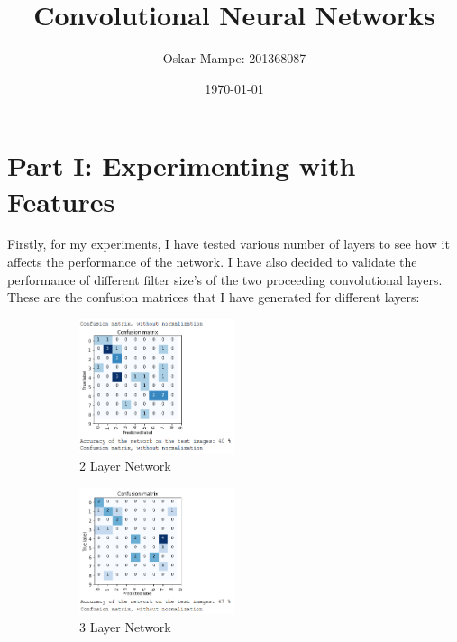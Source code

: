 \documentclass{report}
\author{Oskar Mampe: 201368087}
\date{\today}
\title{Convolutional Neural Networks}
\begin{document}
    \maketitle
    \tableofcontents

    \section{Part I: Experimenting with Features}
    Firstly, for my experiments, I have tested various number of layers to see how it affects the performance of the network. I have also decided to validate the performance of different filter size's of the two proceeding convolutional layers. These are the confusion matrices that I have generated for different layers:
    \begin{figure}[h!]
        \centering
        \begin{subfigure}[t]{0.45\textwidth}
            \centering
            \includegraphics[width=0.5\textwidth]{2_layers}
            \caption{2 Layer Network}
        \end{subfigure}
        \begin{subfigure}[t]{0.45\textwidth}
            \centering
            \includegraphics[width=0.5\textwidth]{3_layers}
            \caption{3 Layer Network}
        \end{subfigure}
        \begin{subfigure}[t]{0.45\textwidth}
            \centering

\end{subfigure}
\end{figure}
\end{document}
